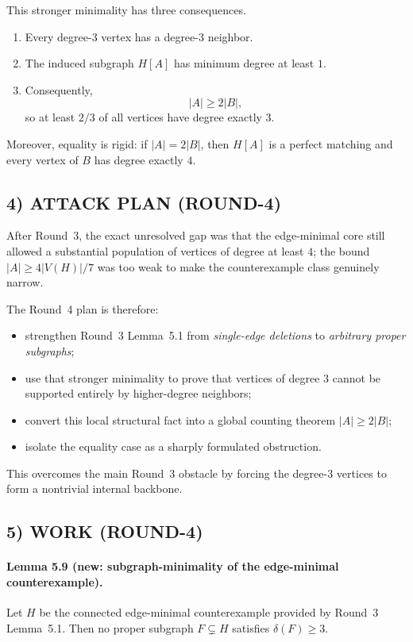 This stronger minimality has three consequences.
\begin{enumerate}
  \item Every degree-$3$ vertex has a degree-$3$ neighbor.
  \item The induced subgraph $H[A]$ has minimum degree at least $1$.
  \item Consequently,
  \[
    |A|\ge 2|B|,
  \]
  so at least $2/3$ of all vertices have degree exactly $3$.
\end{enumerate}
Moreover, equality is rigid: if $|A|=2|B|$, then $H[A]$ is a perfect matching and every vertex of $B$ has degree exactly $4$.

\subsection*{4) ATTACK PLAN (ROUND-4)}
After Round~3, the exact unresolved gap was that the edge-minimal core still allowed a substantial population of vertices of degree at least $4$; the bound $|A|\ge 4|V(H)|/7$ was too weak to make the counterexample class genuinely narrow.

The Round~4 plan is therefore:
\begin{itemize}
  \item strengthen Round~3 Lemma~5.1 from \emph{single-edge deletions} to \emph{arbitrary proper subgraphs};
  \item use that stronger minimality to prove that vertices of degree $3$ cannot be supported entirely by higher-degree neighbors;
  \item convert this local structural fact into a global counting theorem $|A|\ge 2|B|$;
  \item isolate the equality case as a sharply formulated obstruction.
\end{itemize}
This overcomes the main Round~3 obstacle by forcing the degree-$3$ vertices to form a nontrivial internal backbone.

\subsection*{5) WORK (ROUND-4)}

\paragraph{Lemma 5.9 (new: subgraph-minimality of the edge-minimal counterexample).}
Let $H$ be the connected edge-minimal counterexample provided by Round~3 Lemma~5.1. Then no proper subgraph $F\subsetneq H$ satisfies $\delta(F)\ge 3$.

